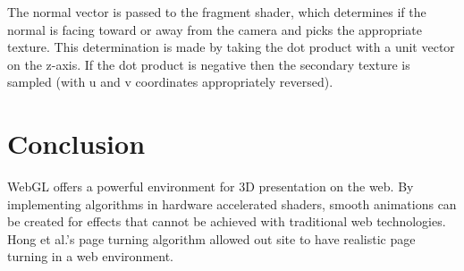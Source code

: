 \documentclass{acmsiggraph}                     %
\begin{document}
The normal vector is passed to the fragment shader, which determines if the normal is facing toward or away from the camera and picks the appropriate texture. This determination is made by taking the dot product with a unit vector on the z-axis. If the dot product is negative then the secondary texture is sampled (with u and v coordinates appropriately reversed).


\section{Conclusion}

WebGL offers a powerful environment for 3D presentation on the web. By implementing algorithms in hardware accelerated shaders, smooth animations can be created for effects that cannot be achieved with traditional web technologies. Hong et al.'s page turning algorithm allowed out site to have realistic page turning in a web environment.


\nocite{*}

\end{document}
